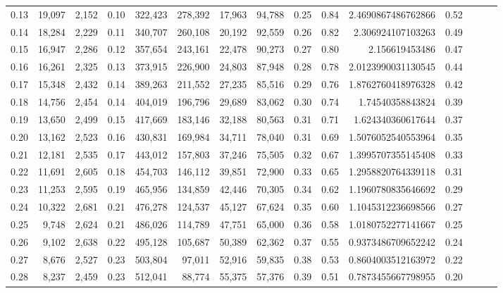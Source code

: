 \begin{tabular}{rrrrrrrrrrrrrrr}
0.13 &  19,097 &  2,152 &  0.10 &  322,423 &  278,392 &   17,963 &   94,788 &  0.25 &  0.84 &      2.4690867486762866 &      0.52 \\
0.14 &  18,284 &  2,229 &  0.11 &  340,707 &  260,108 &   20,192 &   92,559 &  0.26 &  0.82 &       2.306924107103263 &      0.49 \\
0.15 &  16,947 &  2,286 &  0.12 &  357,654 &  243,161 &   22,478 &   90,273 &  0.27 &  0.80 &          2.156619453486 &      0.47 \\
0.16 &  16,261 &  2,325 &  0.13 &  373,915 &  226,900 &   24,803 &   87,948 &  0.28 &  0.78 &      2.0123990031130545 &      0.44 \\
0.17 &  15,348 &  2,432 &  0.14 &  389,263 &  211,552 &   27,235 &   85,516 &  0.29 &  0.76 &      1.8762760418976328 &      0.42 \\
0.18 &  14,756 &  2,454 &  0.14 &  404,019 &  196,796 &   29,689 &   83,062 &  0.30 &  0.74 &        1.74540358843824 &      0.39 \\
0.19 &  13,650 &  2,499 &  0.15 &  417,669 &  183,146 &   32,188 &   80,563 &  0.31 &  0.71 &       1.624340360617644 &      0.37 \\
0.20 &  13,162 &  2,523 &  0.16 &  430,831 &  169,984 &   34,711 &   78,040 &  0.31 &  0.69 &      1.5076052540553964 &      0.35 \\
0.21 &  12,181 &  2,535 &  0.17 &  443,012 &  157,803 &   37,246 &   75,505 &  0.32 &  0.67 &      1.3995707355145408 &      0.33 \\
0.22 &  11,691 &  2,605 &  0.18 &  454,703 &  146,112 &   39,851 &   72,900 &  0.33 &  0.65 &      1.2958820764339118 &      0.31 \\
0.23 &  11,253 &  2,595 &  0.19 &  465,956 &  134,859 &   42,446 &   70,305 &  0.34 &  0.62 &      1.1960780835646692 &      0.29 \\
0.24 &  10,322 &  2,681 &  0.21 &  476,278 &  124,537 &   45,127 &   67,624 &  0.35 &  0.60 &      1.1045312236698566 &      0.27 \\
0.25 &   9,748 &  2,624 &  0.21 &  486,026 &  114,789 &   47,751 &   65,000 &  0.36 &  0.58 &      1.0180752277141667 &      0.25 \\
0.26 &   9,102 &  2,638 &  0.22 &  495,128 &  105,687 &   50,389 &   62,362 &  0.37 &  0.55 &      0.9373486709652242 &      0.24 \\
0.27 &   8,676 &  2,527 &  0.23 &  503,804 &   97,011 &   52,916 &   59,835 &  0.38 &  0.53 &      0.8604003512163972 &      0.22 \\
0.28 &   8,237 &  2,459 &  0.23 &  512,041 &   88,774 &   55,375 &   57,376 &  0.39 &  0.51 &      0.7873455667798955 &      0.20 \\

\end{tabular}
